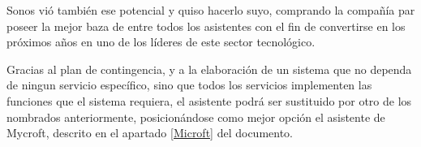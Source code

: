 \begin{enumerate}
        Sonos vió también ese potencial y quiso hacerlo suyo, comprando la compañía par poseer la mejor baza de entre todos los asistentes con el fin de convertirse en los próximos años en uno de los líderes de este sector tecnológico.
        
        Gracias al plan de contingencia, y a la elaboración de un sistema que no dependa de ningun servicio específico, sino que todos los servicios implementen las funciones que el sistema requiera, el asistente podrá ser sustituido por otro de los nombrados anteriormente, posicionándose como mejor opción el asistente de Mycroft, descrito en el apartado \ref{Microft} del documento.
        
        
        \end{enumerate}